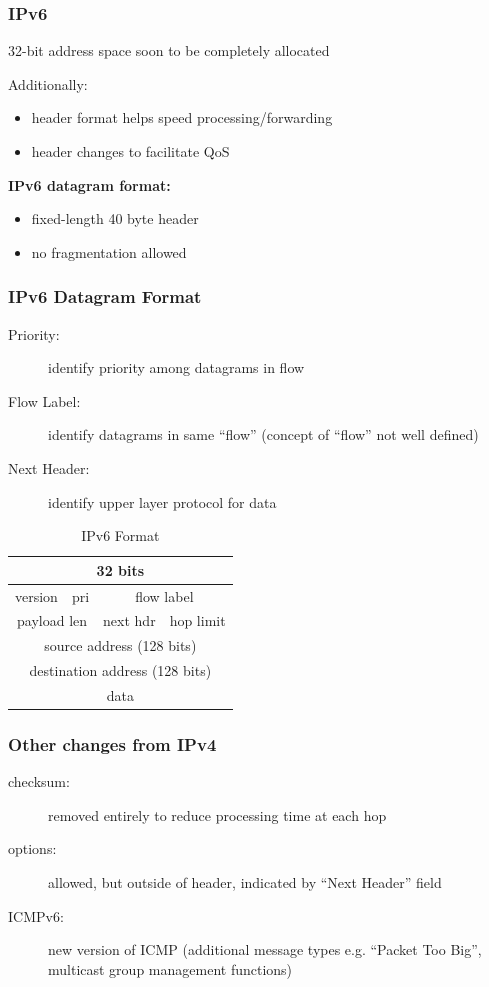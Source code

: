 \subsubsection{IPv6}
\begin{leftbar}
	32-bit address space soon to be completely allocated
\end{leftbar}
Additionally:
\begin{itemize}
	\item header format helps speed processing/forwarding
	\item header changes to facilitate QoS
\end{itemize}
\textbf{IPv6 datagram format:}
\begin{itemize}
	\item fixed-length 40 byte header
	\item no fragmentation allowed
\end{itemize}
\subsubsection{IPv6 Datagram Format}
\begin{description}
	\item[Priority:] identify priority among datagrams in flow
	\item[Flow Label:] identify datagrams in same ``flow'' (concept of ``flow'' not well defined)
	\item[Next Header:] identify upper layer protocol for data
\end{description}
\begin{table}[H]
	\centering
	\caption{IPv6 Format}
	\begin{tabular}{cccc}
		\toprule
		\multicolumn{4}{c}{32 bits}\\
		\midrule
		version & pri & \multicolumn{2}{c}{flow label}\\
		\multicolumn{2}{c}{payload len} & next hdr & hop limit\\
		\multicolumn{4}{c}{source address (128 bits)}\\
		\multicolumn{4}{c}{destination address (128 bits)}\\
		\multicolumn{4}{c}{data}\\
		\bottomrule
	\end{tabular}
\end{table}
\subsubsection{Other changes from IPv4}
\begin{description}
	\item[checksum:] removed entirely to reduce processing time at each hop
	\item[options:] allowed, but outside of header, indicated by ``Next Header'' field
	\item[ICMPv6:] new version of ICMP (additional message types e.g. ``Packet Too Big'', multicast group management functions)
\end{description}

